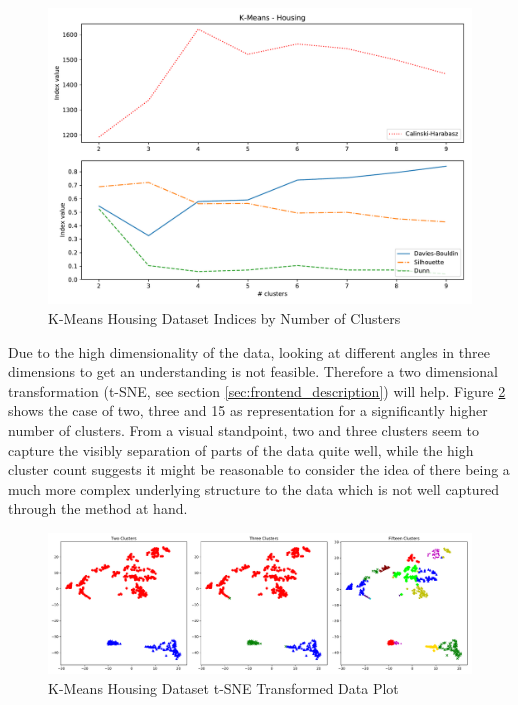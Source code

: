 \begin{figure}[H]
\caption{K-Means Housing Dataset Indices by Number of Clusters}
\begin{center}
\includegraphics[width=1.0\textwidth]{images/kmeans_housing_index_plot.pdf}
\end{center}
\label{fig:kmeans_housing_indices_plot}
\end{figure}

\vspace{-0.5cm}
Due to the high dimensionality of the data, looking at different angles in three dimensions to get an understanding is not feasible. Therefore a two dimensional transformation (t-SNE, see section \ref{sec:frontend_description}) will help. Figure \ref{fig:kmeans_housing_2d_comparison} shows the case of two, three and 15 as representation for a significantly higher number of clusters. From a visual standpoint, two and three clusters seem to capture the visibly separation of parts of the data quite well, while the high cluster count suggests it might be reasonable to consider the idea of there being a much more complex underlying structure to the data which is not well captured through the method at hand.

\begin{figure}[H]
\caption{K-Means Housing Dataset t-SNE Transformed Data Plot}
\begin{center}
\includegraphics[width=1.0\textwidth]{images/kmeans_housing_tsne.pdf}
\end{center}
\label{fig:kmeans_housing_2d_comparison}
\end{figure}
\vspace{-0.5cm}

